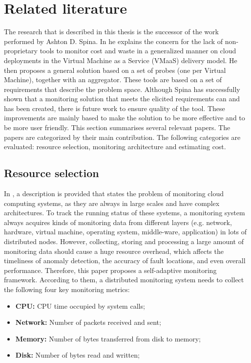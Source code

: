 \section{Related literature} \label{sec:related_literature}
The research that is described in this thesis is the successor of the work performed by Ashton D. Spina. In \cite{spina} he explains the concern for the lack of non-proprietary tools to monitor cost and waste in a generalized manner on cloud deployments in the Virtual Machine as a Service (VMaaS) delivery model. He then proposes a general solution based on a set of probes (one per Virtual Machine), together with an aggregator. These tools are based on a set of requirements that describe the problem space. Although Spina has successfully shown that a monitoring solution that meets the elicited requirements can and has been created, there is future work to ensure quality of the tool. These improvements are mainly based to make the solution to be more effective and to be more user friendly. This section summarises several relevant papers. The papers are categorized by their main contribution. The following categories are evaluated: resource selection, monitoring architecture and estimating cost.

\subsection{Resource selection} \label{sec:resource_selection}
In \cite{wang2018self}, a description is provided that states the problem of monitoring cloud computing systems, as they are always in large scales and have complex architectures. To track the running status of these systems, a monitoring system always acquires kinds of monitoring data from different layers (e.g. network, hardware, virtual machine, operating system, middle-ware, application) in lots of distributed nodes. However, collecting, storing and processing a large amount of monitoring data should cause a huge resource overhead, which affects the timeliness of anomaly detection, the accuracy of fault locations, and even overall performance. Therefore, this paper proposes a self-adaptive monitoring framework. According to them, a distributed monitoring system needs to collect the following four key monitoring metrics:
\begin{itemize}
    \item \textbf{CPU: }CPU time occupied by system calls;
    \item \textbf{Network: }Number of packets received and sent;
    \item \textbf{Memory: }Number of bytes transferred from disk to memory;
    \item \textbf{Disk: }Number of bytes read and written;
\end{itemize}

